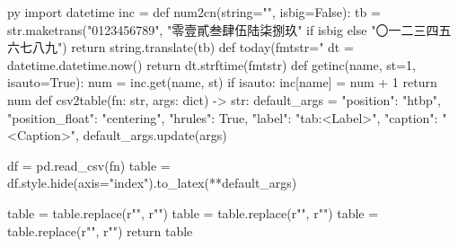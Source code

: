 \begin{pythontexcustomcode}{py}
import datetime
inc = {}
def num2cn(string="", isbig=False):
    tb = str.maketrans("0123456789", "零壹貳叁肆伍陆柒捌玖" if isbig else "〇一二三四五六七八九")
    return string.translate(tb)
def today(fmtstr="%
    dt = datetime.datetime.now()
    return dt.strftime(fmtstr)
def getinc(name, st=1, isauto=True):
    num = inc.get(name, st)
    if isauto:
        inc[name] = num + 1
    return num
def csv2table(fn: str, args: dict) -> str:
    default_args = {
        "position": "htbp",
        "position_float": "centering",
        "hrules": True,
        "label": "tab:<Label>",
        "caption": "<Caption>",}
    default_args.update(args)

    df = pd.read_csv(fn)
    table = df.style.hide(axis="index").to_latex(**default_args)

    table = table.replace(r"\toprule", r"\hline")
    table = table.replace(r"\midrule", r"\hline")
    table = table.replace(r"\bottomrule", r"\hline")
    return table
\end{pythontexcustomcode}
